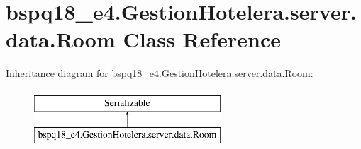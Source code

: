 \hypertarget{classbspq18__e4_1_1_gestion_hotelera_1_1server_1_1data_1_1_room}{}\section{bspq18\+\_\+e4.\+Gestion\+Hotelera.\+server.\+data.\+Room Class Reference}
\label{classbspq18__e4_1_1_gestion_hotelera_1_1server_1_1data_1_1_room}
Inheritance diagram for bspq18\+\_\+e4.\+Gestion\+Hotelera.\+server.\+data.\+Room\+:\begin{figure}[H]
\begin{center}
\leavevmode
\includegraphics[height=2.000000cm]{classbspq18__e4_1_1_gestion_hotelera_1_1server_1_1data_1_1_room}
\end{center}
\end{figure}
